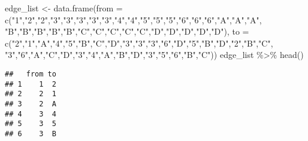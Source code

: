 \documentclass[
]{article}
\newenvironment{Shaded}{\begin{snugshade}}{\end{snugshade}}
\newcommand{\AttributeTok}[1]{\textcolor[rgb]{0.77,0.63,0.00}{#1}}
\newcommand{\FunctionTok}[1]{\textcolor[rgb]{0.00,0.00,0.00}{#1}}
\newcommand{\NormalTok}[1]{#1}
\newcommand{\OtherTok}[1]{\textcolor[rgb]{0.56,0.35,0.01}{#1}}
\newcommand{\SpecialCharTok}[1]{\textcolor[rgb]{0.00,0.00,0.00}{#1}}
\newcommand{\StringTok}[1]{\textcolor[rgb]{0.31,0.60,0.02}{#1}}
\begin{document}
\begin{Shaded}
\begin{Highlighting}[]
\NormalTok{edge\_list }\OtherTok{\textless{}{-}} \FunctionTok{data.frame}\NormalTok{(}\AttributeTok{from =} 
                          \FunctionTok{c}\NormalTok{(}\StringTok{"1"}\NormalTok{,}\StringTok{"2"}\NormalTok{,}\StringTok{"2"}\NormalTok{,}\StringTok{"3"}\NormalTok{,}\StringTok{"3"}\NormalTok{,}\StringTok{"3"}\NormalTok{,}\StringTok{"3"}\NormalTok{,}\StringTok{"3"}\NormalTok{,}\StringTok{"4"}\NormalTok{,}\StringTok{"4"}\NormalTok{,}\StringTok{"5"}\NormalTok{,}\StringTok{"5"}\NormalTok{,}\StringTok{"5"}\NormalTok{,}\StringTok{"6"}\NormalTok{,}\StringTok{"6"}\NormalTok{,}\StringTok{"6"}\NormalTok{,}\StringTok{"A"}\NormalTok{,}\StringTok{"A"}\NormalTok{,}\StringTok{"A"}\NormalTok{,}
                            \StringTok{"B"}\NormalTok{,}\StringTok{"B"}\NormalTok{,}\StringTok{"B"}\NormalTok{,}\StringTok{"B"}\NormalTok{,}\StringTok{"B"}\NormalTok{,}\StringTok{"C"}\NormalTok{,}\StringTok{"C"}\NormalTok{,}\StringTok{"C"}\NormalTok{,}\StringTok{"C"}\NormalTok{,}\StringTok{"C"}\NormalTok{,}\StringTok{"D"}\NormalTok{,}\StringTok{"D"}\NormalTok{,}\StringTok{"D"}\NormalTok{,}\StringTok{"D"}\NormalTok{,}\StringTok{"D"}\NormalTok{), }
                        \AttributeTok{to =}
                          \FunctionTok{c}\NormalTok{(}\StringTok{"2"}\NormalTok{,}\StringTok{"1"}\NormalTok{,}\StringTok{"A"}\NormalTok{,}\StringTok{"4"}\NormalTok{,}\StringTok{"5"}\NormalTok{,}\StringTok{"B"}\NormalTok{,}\StringTok{"C"}\NormalTok{,}\StringTok{"D"}\NormalTok{,}\StringTok{"3"}\NormalTok{,}\StringTok{"3"}\NormalTok{,}\StringTok{"3"}\NormalTok{,}\StringTok{"6"}\NormalTok{,}\StringTok{"D"}\NormalTok{,}\StringTok{"5"}\NormalTok{,}\StringTok{"B"}\NormalTok{,}\StringTok{"D"}\NormalTok{,}\StringTok{"2"}\NormalTok{,}\StringTok{"B"}\NormalTok{,}\StringTok{"C"}\NormalTok{,}
                            \StringTok{"3"}\NormalTok{,}\StringTok{"6"}\NormalTok{,}\StringTok{"A"}\NormalTok{,}\StringTok{"C"}\NormalTok{,}\StringTok{"D"}\NormalTok{,}\StringTok{"3"}\NormalTok{,}\StringTok{"4"}\NormalTok{,}\StringTok{"A"}\NormalTok{,}\StringTok{"B"}\NormalTok{,}\StringTok{"D"}\NormalTok{,}\StringTok{"3"}\NormalTok{,}\StringTok{"5"}\NormalTok{,}\StringTok{"6"}\NormalTok{,}\StringTok{"B"}\NormalTok{,}\StringTok{"C"}\NormalTok{))}
\NormalTok{edge\_list }\SpecialCharTok{\%\textgreater{}\%} \FunctionTok{head}\NormalTok{()}
\end{Highlighting}
\end{Shaded}

\begin{verbatim}
##   from to
## 1    1  2
## 2    2  1
## 3    2  A
## 4    3  4
## 5    3  5
## 6    3  B
\end{verbatim}
\end{document}
